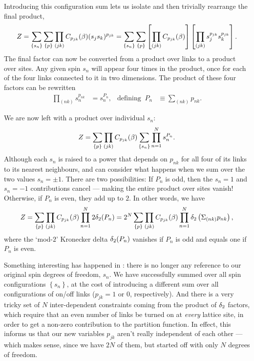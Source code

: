 Introducing this configuration sum lets us isolate and then trivially rearrange the final product,
\begin{equation*}
  Z = \sum_{\left\{s_n\right\}} \sum_{\left\{p\right\}} \prod_{(jk)} C_{p_{jk}}(\beta) (s_j s_k)^{p_{jk}} = \sum_{\left\{s_n\right\}} \sum_{\left\{p\right\}} \left[\prod_{(jk)} C_{p_{jk}}(\beta)\right] \left[\prod_{(jk)} s_j^{p_{jk}} s_k^{p_{jk}}\right].
\end{equation*}
The final factor can now be converted from a product over links to a product over sites.
Any given spin $s_n$ will appear four times in the product, once for each of the four links connected to it in two dimensions.
The product of these four factors can be rewritten
\begin{align*}
  \prod_{(nk)} s_n^{p_{nk}} & = s_n^{P_n}, &
  \mbox{defining } \ P_n & \equiv \sum_{(nk)} p_{nk}.
\end{align*}

We are now left with a product over individual $s_n$:
\begin{equation*}
  Z = \sum_{\left\{p\right\}} \prod_{(jk)} C_{p_{jk}}(\beta) \sum_{\left\{s_n\right\}} \prod_{n = 1}^N s_n^{P_n}.
\end{equation*}
Although each $s_n$ is raised to a power that depends on $p_{nk}$ for all four of its links to its nearest neighbours, and can consider what happens when we sum over the two values $s_n = \pm 1$.
There are two possibilities: If $P_n$ is odd, then the $s_n = 1$ and $s_n = -1$ contributions cancel --- making the entire product over sites vanish!
Otherwise, if $P_n$ is even, they add up to $2$.
In other words, we have
\begin{equation}
  \label{eq:constrained_Ising}
  Z = \sum_{\left\{p\right\}} \prod_{(jk)} C_{p_{jk}}(\beta) \prod_{n = 1}^N 2\delta_2(P_n) = 2^N \sum_{\left\{p\right\}} \prod_{(jk)} C_{p_{jk}}(\beta) \prod_{n = 1}^N \delta_2\left(\Sigma_{(nk)} p_{nk}\right),
\end{equation}
where the `mod-$2$' Kronecker delta $\delta_2(P_n)$ vanishes if $P_n$ is odd and equals one if $P_n$ is even.

Something interesting has happened in : there is no longer any reference to our original spin degrees of freedom, $s_n$.
We have successfully summed over all spin configurations $\left\{s_n\right\}$, at the cost of introducing a different sum over all configurations of on/off links ($p_{jk} = 1$ or $0$, respectively).
And there is a very tricky set of $N$ inter-dependent constraints coming from the product of $\delta_2$ factors, which require that an even number of links be turned on at \textit{every} lattice site, in order to get a non-zero contribution to the partition function.
In effect, this informs us that our new variables $p_{jk}$ aren't really independent of each other --- which makes sense, since we have $2N$ of them, but started off with only $N$ degrees of freedom.

